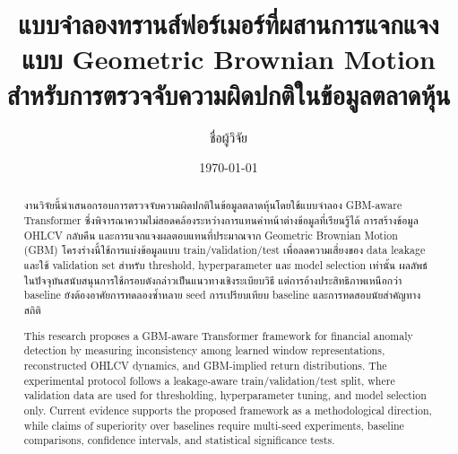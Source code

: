 \documentclass[12pt,a4paper,oneside]{report}
\title{แบบจำลองทรานส์ฟอร์เมอร์ที่ผสานการแจกแจงแบบ Geometric Brownian Motion สำหรับการตรวจจับความผิดปกติในข้อมูลตลาดหุ้น}
\author{ชื่อผู้วิจัย}
\date{\today}
\begin{document}
\maketitle

\begin{abstract}
งานวิจัยนี้นำเสนอกรอบการตรวจจับความผิดปกติในข้อมูลตลาดหุ้นโดยใช้แบบจำลอง GBM-aware Transformer ซึ่งพิจารณาความไม่สอดคล้องระหว่างการแทนค่าหน้าต่างข้อมูลที่เรียนรู้ได้ การสร้างข้อมูล OHLCV กลับคืน และการแจกแจงผลตอบแทนที่ประมาณจาก Geometric Brownian Motion (GBM) โครงร่างนี้ใช้การแบ่งข้อมูลแบบ train/validation/test เพื่อลดความเสี่ยงของ data leakage และใช้ validation set สำหรับ threshold, hyperparameter และ model selection เท่านั้น ผลลัพธ์ในปัจจุบันสนับสนุนการใช้กรอบดังกล่าวเป็นแนวทางเชิงระเบียบวิธี แต่การอ้างประสิทธิภาพเหนือกว่า baseline ยังต้องอาศัยการทดลองซ้ำหลาย seed การเปรียบเทียบ baseline และการทดสอบนัยสำคัญทางสถิติ
\end{abstract}

\begin{english}
\begin{abstract}
This research proposes a GBM-aware Transformer framework for financial anomaly detection by measuring inconsistency among learned window representations, reconstructed OHLCV dynamics, and GBM-implied return distributions. The experimental protocol follows a leakage-aware train/validation/test split, where validation data are used for thresholding, hyperparameter tuning, and model selection only. Current evidence supports the proposed framework as a methodological direction, while claims of superiority over baselines require multi-seed experiments, baseline comparisons, confidence intervals, and statistical significance tests.
\end{abstract}
\end{english}

\tableofcontents
\listoffigures
\listoftables









\appendix



\end{document}
